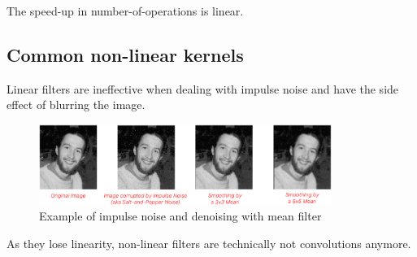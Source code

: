 \begin{description}
\begin{description}
                \begin{remark}
                    The speed-up in number-of-operations is linear.
                \end{remark}
        \end{description}
\end{description}


\subsection{Common non-linear kernels}

\begin{remark}
    Linear filters are ineffective when dealing with impulse noise and 
    have the side effect of blurring the image.

    \begin{figure}[H]
        \centering
        \includegraphics[width=0.85\textwidth]{./img/_impulse_noise_example.pdf}
        \caption{Example of impulse noise and denoising with mean filter}
    \end{figure}
\end{remark}

\begin{remark}
    As they lose linearity, non-linear filters are technically not convolutions anymore.
\end{remark}

